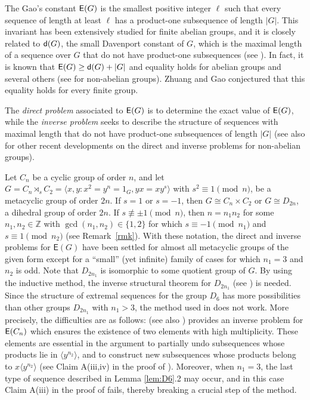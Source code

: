 \documentclass[leqno,a4paper]{amsart}
\def\d{{\sf d}}
\def\E{{\sf E}}
\theoremstyle{plain}
\theoremstyle{definition}
\numberwithin{equation}{section}
\begin{document}
	
	The Gao's constant $\E(G)$ is the smallest positive integer $\ell$ such that every sequence of length at least $\ell$ has a product-one subsequence of length $|G|$.
	This invariant has been extensively studied for finite abelian groups, and it is closely related to $\d(G)$, the small Davenport constant of $G$, which is the maximal length of a sequence over $G$ that do not have product-one subsequences (see \cite[Chapter 16]{Gry}). In fact, it is known that $\E(G) \ge \d(G)+|G|$ and equality holds for abelian groups \cite{Ga0} and several others (see \cite{AMR1,AMR,Bas,MLMR,HZ,QL2,GoSa} for non-abelian groups). Zhuang and Gao \cite{ZhGa} conjectured that this equality holds for every finite group.
	
	The {\em direct problem} associated to $\E(G)$ is to determine the exact value of $\E(G)$, while the {\em inverse problem} seeks to describe the structure of sequences with maximal length that do not have product-one subsequences of length $|G|$ (see also \cite{MR1,MR2,MR3,GLQ,OZ1,OZ2,Zh,QL1} for other recent developments on the direct and inverse problems for non-abelian groups).
	
	
	Let $C_n$ be a cyclic group of order $n$, and let $G = C_{n} \rtimes_s C_2 = \langle x, y \colon x^{2} = y^{n} = 1_G, yx = xy^{s} \rangle$ with $s^2 \equiv 1 \pmod{n}$,  be a metacyclic group of order $2n$. If $s = 1$ or $s = -1$, then $G \cong C_n \times C_2$ or $G \cong D_{2n}$, a dihedral group of order $2n$.
	If $s \not\equiv \pm 1 \pmod{n}$, then $n = n_1 n_2$ for some $n_1, n_2 \in \mathbb Z$ with $\gcd (n_1, n_2) \in \{ 1, 2 \}$ for which $s \equiv -1 \pmod{n_1}$ and $s \equiv 1 \pmod{n_2}$ (see Remark~\ref{rmk}). With these notation, the direct and inverse problems for $\mathsf E (G)$ have been settled for almost all metacyclic groups of the given form except for a ``small'' (yet infinite) family of cases for which $n_1=3$ and $n_2$ is odd. Note that $D_{2n_1}$ is isomorphic to some quotient group of $G$. By using the inductive method, the inverse structural theorem for $D_{2n_1}$ (see \cite[Theorem 1.2]{OZ1}) is needed.
	 Since the structure of extremal sequences for the group $D_6$ has more possibilities than other groups $D_{2n_1}$ with $n_1>3$, the method used in \cite{AMR} does not work. More precisely, the difficulties are as follows: \cite[Lemma 2.1]{AMR} (see also \cite{Ga}) provides an inverse problem for $\E(C_n)$ which ensures the existence of two elements with high multiplicity. These elements are essential in the argument to partially undo subsequences whose products lie in $\langle y^{n_2} \rangle$, and to construct new subsequences whose products belong to $x \langle y^{n_2} \rangle$ (see Claim A(iii,iv) in the proof of \cite[Proposition 5.1]{AMR}). Moreover, when $n_1 = 3$, the last type of sequence described in Lemma \ref{lem:D6}.2 may occur, and in this case Claim A(iii) in the proof of \cite[Proposition 5.1]{AMR} fails, thereby breaking a crucial step of the method.
	
\end{document}
